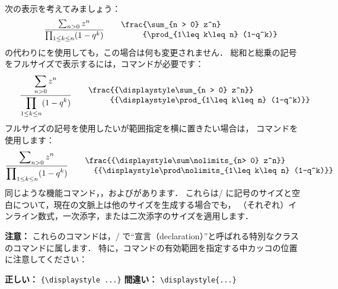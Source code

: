 次の表示を考えてみましょう：
\[\frac{\sum_{n > 0} z^n}{\prod_{1\leq k\leq n} (1-q^k)}
\qquad\begin{minipage}{.5\columnwidth}
\begin{verbatim}
\frac{\sum_{n > 0} z^n}
     {\prod_{1\leq k\leq n} (1-q^k)}
\end{verbatim}
\end{minipage}
\]
の代わりにを使用しても，この場合は何も変更されません．
総和と総乗の記号をフルサイズで表示するには，コマンドが必要です：
\[
\frac{{\displaystyle\sum_{n > 0} z^n}}
     {{\displaystyle\prod_{1\leq k\leq n} (1-q^k)}}
\qquad\begin{minipage}{.7\columnwidth}
\begin{verbatim}
\frac{{\displaystyle\sum_{n > 0} z^n}}
     {{\displaystyle\prod_{1\leq k\leq n} (1-q^k)}}
\end{verbatim}
\end{minipage}
\]
フルサイズの記号を使用したいが範囲指定を横に置きたい場合は，
コマンドを使用します：
\[
\frac{{\displaystyle\sum\nolimits_{n> 0} z^n}}
  {{\displaystyle\prod\nolimits_{1\leq k\leq n} (1-q^k)}}
\qquad\begin{minipage}{.76\columnwidth}
\begin{verbatim}
\frac{{\displaystyle\sum\nolimits_{n> 0} z^n}}
  {{\displaystyle\prod\nolimits_{1\leq k\leq n} (1-q^k)}}
\end{verbatim}
\end{minipage}
\]
同じような機能コマンド，，およびがあります．
これらは\lat/ に記号のサイズと空白について，現在の文脈上は他のサイズを生成する場合でも，
（それぞれ）インライン数式，一次添字，または二次添字のサイズを適用します．

\textbf{注意：} これらのコマンドは，\lat/ で``宣言（declaration）''と呼ばれる特別なクラスのコマンドに属します．
特に，コマンドの有効範囲を指定する中カッコの位置に注意してください：
\begin{center}
\textbf{正しい： } \verb'{\displaystyle ...}'
\qquad\qquad\textbf{間違い：} \verb'\displaystyle{...}'
\end{center}


